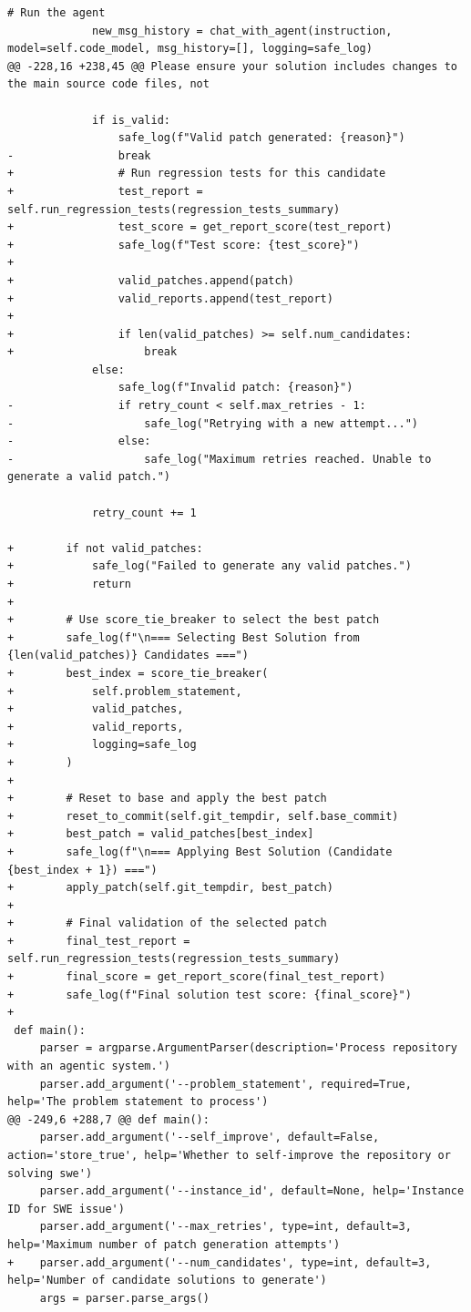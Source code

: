 \documentclass{article} %
\begin{document}
\begin{lstlisting}[style=diffstyle]
             # Run the agent
             new_msg_history = chat_with_agent(instruction, model=self.code_model, msg_history=[], logging=safe_log)
@@ -228,16 +238,45 @@ Please ensure your solution includes changes to the main source code files, not
             
             if is_valid:
                 safe_log(f"Valid patch generated: {reason}")
-                break
+                # Run regression tests for this candidate
+                test_report = self.run_regression_tests(regression_tests_summary)
+                test_score = get_report_score(test_report)
+                safe_log(f"Test score: {test_score}")
+
+                valid_patches.append(patch)
+                valid_reports.append(test_report)
+
+                if len(valid_patches) >= self.num_candidates:
+                    break
             else:
                 safe_log(f"Invalid patch: {reason}")
-                if retry_count < self.max_retries - 1:
-                    safe_log("Retrying with a new attempt...")
-                else:
-                    safe_log("Maximum retries reached. Unable to generate a valid patch.")
             
             retry_count += 1
 
+        if not valid_patches:
+            safe_log("Failed to generate any valid patches.")
+            return
+
+        # Use score_tie_breaker to select the best patch
+        safe_log(f"\n=== Selecting Best Solution from {len(valid_patches)} Candidates ===")
+        best_index = score_tie_breaker(
+            self.problem_statement,
+            valid_patches,
+            valid_reports,
+            logging=safe_log
+        )
+
+        # Reset to base and apply the best patch
+        reset_to_commit(self.git_tempdir, self.base_commit)
+        best_patch = valid_patches[best_index]
+        safe_log(f"\n=== Applying Best Solution (Candidate {best_index + 1}) ===")
+        apply_patch(self.git_tempdir, best_patch)
+
+        # Final validation of the selected patch
+        final_test_report = self.run_regression_tests(regression_tests_summary)
+        final_score = get_report_score(final_test_report)
+        safe_log(f"Final solution test score: {final_score}")
+
 def main():
     parser = argparse.ArgumentParser(description='Process repository with an agentic system.')
     parser.add_argument('--problem_statement', required=True, help='The problem statement to process')
@@ -249,6 +288,7 @@ def main():
     parser.add_argument('--self_improve', default=False, action='store_true', help='Whether to self-improve the repository or solving swe')
     parser.add_argument('--instance_id', default=None, help='Instance ID for SWE issue')
     parser.add_argument('--max_retries', type=int, default=3, help='Maximum number of patch generation attempts')
+    parser.add_argument('--num_candidates', type=int, default=3, help='Number of candidate solutions to generate')
     args = parser.parse_args()
 

\end{lstlisting}
\end{document}
